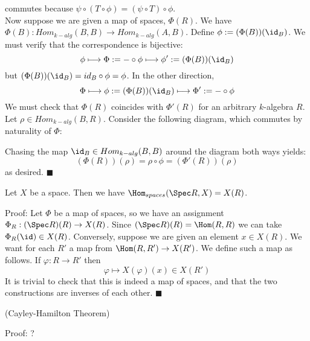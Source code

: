 \documentclass[10 pt]{article}
\newtheorem{cor}{Corollary}[section]
\newtheorem{lem}{Lemma}[section]
\newtheorem{prop}{Proposition}[section]
\newtheorem{propconstr}{Proposition-Construction}[section]
\newcommand\begin{lemma}{\begin{lem}}
\newcommand\begin{proposition}{\begin{prop}}
\newcommand\begin{proof}{\begin{proof}}
\newcommand\begin{corollary}{\begin{cor}}
\newcommand\begin{proposition}constr{\begin{propconstr}}
\newcommand\end{definition}{\end{defn}}
\newcommand\end{lemma}{\end{lem}}
\newcommand\end{corollary}{\end{cor}}
\newcommand\end{proposition}{\end{prop}}
\newcommand\end{proof}{\end{proof}}
\newcommand\end{proposition}constr{\end{propconstr}}
\begin{document}

commutes because $\psi\circ(T\circ\phi)=(\psi\circ T)\circ\phi$.\\
Now suppose we are given a map of spaces, $\Phi(R)$.  We have $\Phi(B):Hom_{k-alg}(B,B)\rightarrow Hom_{k-alg}(A,B)$.  Define $\phi:=(\Phi(B))(\id_B)$.  We must verify that the correspondence is bijective:
$$\phi \longmapsto \Phi:=-\circ\phi \longmapsto \phi':= (\Phi(B))(\id_B)$$
but $(\Phi(B))(\id_B)=id_B\circ\phi=\phi$.  In the other direction,
$$\Phi\longmapsto \phi:=(\Phi(B))(\id_B) \longmapsto \Phi':=-\circ\phi$$
We must check that $\Phi(R)$ coincides with $\Phi'(R)$ for an arbitrary $k$-algebra $R$.  Let $\rho\in Hom_{k-alg}(B,R)$.  Consider the following diagram, which commutes by naturality of $\Phi$:\\


Chasing the map $\id_B\in Hom_{k-alg}(B,B)$ around the diagram both ways yields:
$$(\Phi(R))(\rho) = \rho\circ\phi = (\Phi'(R))(\rho)$$
as desired. $\blacksquare$

\begin{proposition} Let $X$ be a space.  Then we have $\Hom_{spaces}(\Spec R,X)=X(R)$. \end{proposition}

Proof:  Let $\Phi$ be a map of spaces, so we have an assignment $\Phi_R:(\Spec R)(R)\rightarrow X(R)$.  Since $(\Spec R)(R)=\Hom(R,R)$ we can take $\Phi_R(\id)\in X(R)$.  Conversely, suppose we are given an element $x\in X(R)$.  We want for each $R'$ a map from $\Hom(R,R')\rightarrow X(R')$.  We define such a map as follows.  If $\varphi:R\rightarrow R'$ then
$$\varphi \longmapsto X(\varphi)(x)\in X(R')$$
It is trivial to check that this is indeed a map of spaces, and that the two constructions are inverses of each other. $\blacksquare$

\begin{proposition} (Cayley-Hamilton Theorem) \end{proposition}

Proof:  ?
\end{document}
